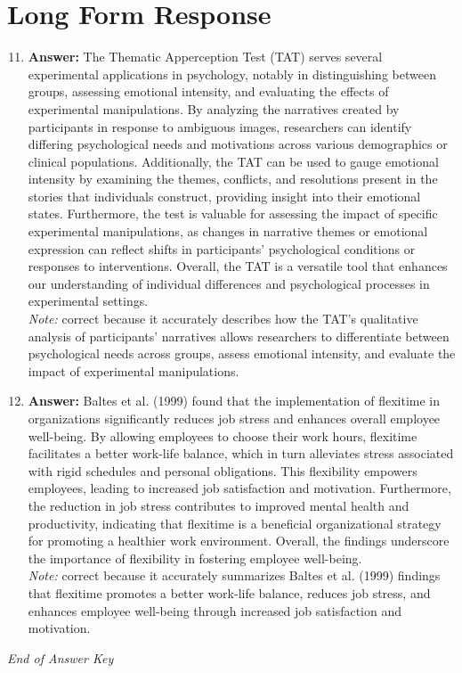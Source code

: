 \documentclass[12pt]{article}
\begin{document}
\section*{Long Form Response}
\begin{enumerate}[label=\arabic*.]
\setcounter{enumi}{10}
\item \textbf{Answer:} The Thematic Apperception Test (TAT) serves several experimental applications in psychology, notably in distinguishing between groups, assessing emotional intensity, and evaluating the effects of experimental manipulations. By analyzing the narratives created by participants in response to ambiguous images, researchers can identify differing psychological needs and motivations across various demographics or clinical populations. Additionally, the TAT can be used to gauge emotional intensity by examining the themes, conflicts, and resolutions present in the stories that individuals construct, providing insight into their emotional states. Furthermore, the test is valuable for assessing the impact of specific experimental manipulations, as changes in narrative themes or emotional expression can reflect shifts in participants' psychological conditions or responses to interventions. Overall, the TAT is a versatile tool that enhances our understanding of individual differences and psychological processes in experimental settings.
\\ \textit{Note:} correct because it accurately describes how the TAT's qualitative analysis of participants' narratives allows researchers to differentiate between psychological needs across groups, assess emotional intensity, and evaluate the impact of experimental manipulations.
\item \textbf{Answer:} Baltes et al. (1999) found that the implementation of flexitime in organizations significantly reduces job stress and enhances overall employee well-being. By allowing employees to choose their work hours, flexitime facilitates a better work-life balance, which in turn alleviates stress associated with rigid schedules and personal obligations. This flexibility empowers employees, leading to increased job satisfaction and motivation. Furthermore, the reduction in job stress contributes to improved mental health and productivity, indicating that flexitime is a beneficial organizational strategy for promoting a healthier work environment. Overall, the findings underscore the importance of flexibility in fostering employee well-being.
\\ \textit{Note:} correct because it accurately summarizes Baltes et al. (1999) findings that flexitime promotes a better work-life balance, reduces job stress, and enhances employee well-being through increased job satisfaction and motivation.
\end{enumerate}

\vfill
\noindent\textit{End of Answer Key}
\end{document}
